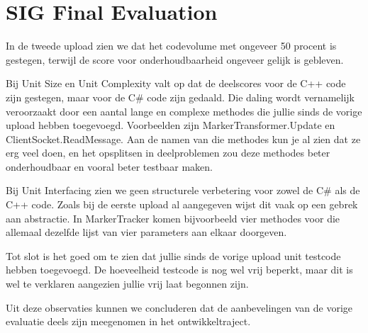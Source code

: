 \chapter{SIG Final Evaluation} \label{app:sig2}


	In de tweede upload zien we dat het codevolume met ongeveer 50 procent is gestegen, terwijl de score voor onderhoudbaarheid ongeveer gelijk is gebleven.
	
	Bij Unit Size en Unit Complexity valt op dat de deelscores voor de C++ code zijn gestegen, maar voor de C\# code zijn gedaald. Die daling wordt vernamelijk veroorzaakt door een aantal lange en complexe methodes die jullie sinds de vorige upload hebben toegevoegd. Voorbeelden zijn MarkerTransformer.Update en ClientSocket.ReadMessage. Aan de namen van die methodes kun je al zien dat ze erg veel doen, en het opsplitsen in deelproblemen zou deze methodes beter onderhoudbaar en vooral beter testbaar maken.
	
	Bij Unit Interfacing zien we geen structurele verbetering voor zowel de C\# als de C++ code. Zoals bij de eerste upload al aangegeven wijst dit vaak op een gebrek aan abstractie. In MarkerTracker komen bijvoorbeeld vier methodes voor die allemaal dezelfde lijst van vier parameters aan elkaar doorgeven.
	
	Tot slot is het goed om te zien dat jullie sinds de vorige upload unit testcode hebben toegevoegd. De hoeveelheid testcode is nog wel vrij beperkt, maar dit is wel te verklaren aangezien jullie vrij laat begonnen zijn.
	
	Uit deze observaties kunnen we concluderen dat de aanbevelingen van de vorige evaluatie deels zijn meegenomen in het ontwikkeltraject.
	
